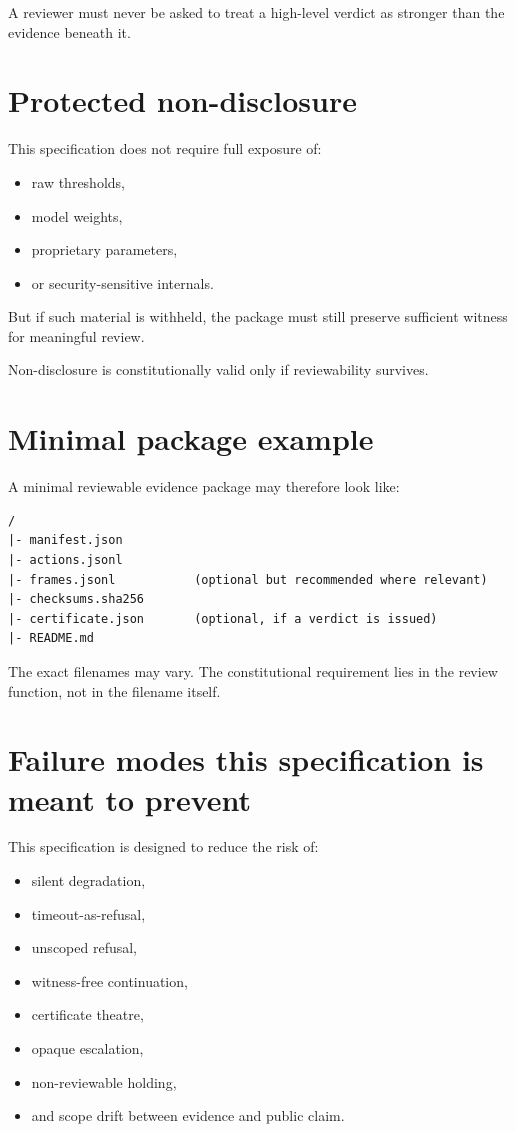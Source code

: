 \documentclass[11pt]{article}
\begin{document}
A reviewer must never be asked to treat a high-level verdict as stronger than the evidence beneath it.

\section{Protected non-disclosure}

This specification does not require full exposure of:
\begin{itemize}[leftmargin=2em]
    \item raw thresholds,
    \item model weights,
    \item proprietary parameters,
    \item or security-sensitive internals.
\end{itemize}

But if such material is withheld, the package must still preserve sufficient witness for meaningful review.

Non-disclosure is constitutionally valid only if reviewability survives.

\section{Minimal package example}

A minimal reviewable evidence package may therefore look like:

\begin{verbatim}
/
|- manifest.json
|- actions.jsonl
|- frames.jsonl           (optional but recommended where relevant)
|- checksums.sha256
|- certificate.json       (optional, if a verdict is issued)
|- README.md
\end{verbatim}

The exact filenames may vary. The constitutional requirement lies in the review function, not in the filename itself.

\section{Failure modes this specification is meant to prevent}

This specification is designed to reduce the risk of:
\begin{itemize}[leftmargin=2em]
    \item silent degradation,
    \item timeout-as-refusal,
    \item unscoped refusal,
    \item witness-free continuation,
    \item certificate theatre,
    \item opaque escalation,
    \item non-reviewable holding,
    \item and scope drift between evidence and public claim.
\end{itemize}
\end{document}
